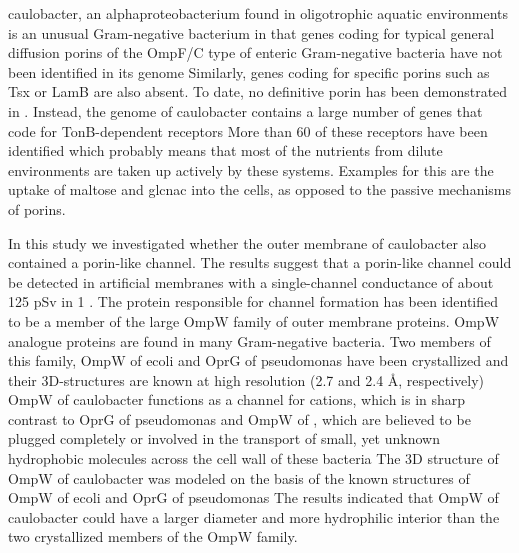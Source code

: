     \acl{caulobacter}, an alphaproteobacterium found in oligotrophic aquatic environments is an unusual Gram-negative bacterium in that genes coding for typical general diffusion porins of the OmpF/C type of enteric Gram-negative bacteria have not been identified in its genome Similarly, genes coding for specific porins such as Tsx or LamB are also absent. To date, no definitive porin has been demonstrated in \caulobacter. Instead, the genome of \ac{caulobacter} contains a large number of genes that code for TonB-dependent receptors More than 60 of these receptors have been identified which probably means that most of the nutrients from dilute environments are taken up actively by these systems. Examples for this are the uptake of maltose and \ac{glcnac} into the cells, as opposed to the passive mechanisms of porins.

    In this study we investigated whether the outer membrane of \ac{caulobacter} also contained a porin-like channel. The results suggest that  a porin-like channel could be detected in artificial membranes with a single-channel conductance of about 125 \si{\pico\sievert} in 1 \si{\molar} . The protein responsible for channel formation has been identified to be a member of the large OmpW family of outer membrane proteins. OmpW analogue proteins are found in many Gram-negative bacteria. Two members of this family, OmpW of \ac{ecoli} and OprG of \acl{pseudomonas} have been crystallized and their 3D-structures are known at high resolution (2.7 and 2.4 \AA, respectively)  OmpW of \ac{caulobacter} functions as a channel for cations, which is in sharp contrast to OprG of \ac{pseudomonas} and OmpW of \ecoli, which are believed to be plugged completely or involved in the transport of small, yet unknown hydrophobic molecules across the cell wall of these bacteria The 3D structure of OmpW of \ac{caulobacter} was modeled on the basis of the known structures of OmpW of \ac{ecoli} and OprG of \ac{pseudomonas} The results indicated that OmpW of \ac{caulobacter} could have a larger diameter and more hydrophilic interior than the two crystallized members of the OmpW family.

